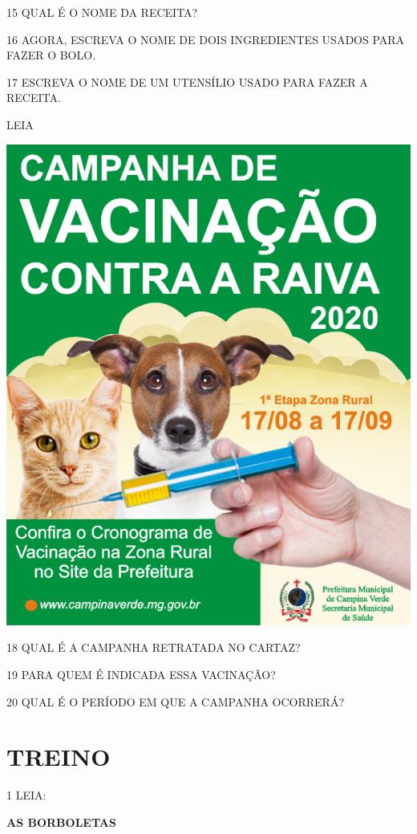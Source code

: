 \num{15} QUAL É O NOME DA RECEITA?


\num{16} AGORA, ESCREVA O NOME DE DOIS INGREDIENTES USADOS PARA FAZER O BOLO.


\num{17} ESCREVA O NOME DE UM UTENSÍLIO USADO PARA FAZER A RECEITA.


LEIA

\begin{center}
\includegraphics[width=.5\textwidth]{media/image131.png}
\end{center}

\num{18} QUAL É A CAMPANHA RETRATADA NO CARTAZ?


\num{19} PARA QUEM É INDICADA ESSA VACINAÇÃO?


\num{20} QUAL É O PERÍODO EM QUE A CAMPANHA OCORRERÁ?


\pagebreak
\section{TREINO}


\num{1} LEIA:

\textbf{AS BORBOLETAS}

